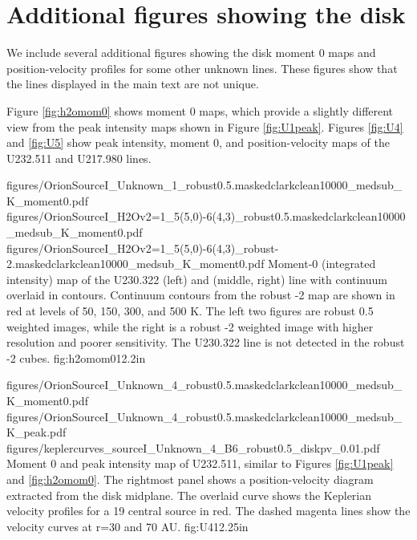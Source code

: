 \documentclass[twocolumn]{aastex61}
\begin{document}
\section{Additional figures showing the disk}
We include several additional figures showing the disk moment 0 maps and
position-velocity profiles for some other unknown lines.  These figures show
that the lines displayed in the main text are not unique.

Figure \ref{fig:h2omom0} shows moment 0 maps, which provide a slightly
different view from the peak intensity maps shown in Figure \ref{fig:U1peak}.
Figures \ref{fig:U4} and \ref{fig:U5} show peak intensity, moment 0, and
position-velocity maps of the U232.511 and U217.980 lines.

\FigureThree
{{figures/OrionSourceI_Unknown_1_robust0.5.maskedclarkclean10000_medsub_K_moment0}.pdf}
{{figures/OrionSourceI_H2Ov2=1_5(5,0)-6(4,3)_robust0.5.maskedclarkclean10000_medsub_K_moment0}.pdf}
{{figures/OrionSourceI_H2Ov2=1_5(5,0)-6(4,3)_robust-2.maskedclarkclean10000_medsub_K_moment0}.pdf}
{Moment-0 (integrated intensity) map of the U230.322 (left) and \water (middle,
right) line with continuum overlaid in contours.  Continuum contours
from the robust -2 map are shown
in red at levels of 
50, 150, 300, and 500 K.
The left two figures are robust 0.5 weighted images, while the right
is a robust -2 weighted image with higher resolution and poorer
sensitivity.  The U230.322 line is not detected in the robust -2 cubes.
}
{fig:h2omom0}{1}{2.2in}

\FigureThree
{{figures/OrionSourceI_Unknown_4_robust0.5.maskedclarkclean10000_medsub_K_moment0}.pdf}
{{figures/OrionSourceI_Unknown_4_robust0.5.maskedclarkclean10000_medsub_K_peak}.pdf}
{{figures/keplercurves_sourceI_Unknown_4_B6_robust0.5_diskpv_0.01}.pdf}
{Moment 0 and peak intensity map of U232.511, similar to Figures \ref{fig:U1peak} and \ref{fig:h2omom0}.
The rightmost panel shows a position-velocity diagram extracted from the disk midplane.
The overlaid  curve shows the Keplerian velocity profiles for a 19 \msun central source in red.
The dashed magenta lines show the velocity curves at r=30 and 70 AU.
}
{fig:U4}{1}{2.25in}
\end{document}
